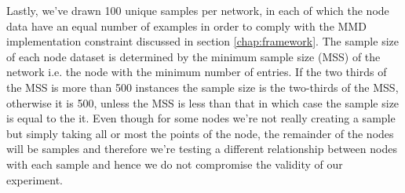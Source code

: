 \documentclass{mpaper}
\begin{document}
Lastly, we've drawn 100 unique samples per network, in each of which the node data have an equal number of examples in order to comply with the MMD implementation constraint discussed in section \ref{chap:framework}. The sample size of each node dataset is determined by the minimum sample size (MSS) of the network i.e. the node with the minimum number of entries. If the two thirds of the MSS is more than 500 instances the sample size is the two-thirds of the MSS, otherwise it is 500, unless the MSS is less than that in which case the sample size is equal to the it. Even though for some nodes we're not really creating a sample but simply taking all or most the points of the node, the remainder of the nodes will be samples and therefore we're testing a different relationship between nodes with each sample and hence we do not compromise the validity of our experiment.
\end{document}
